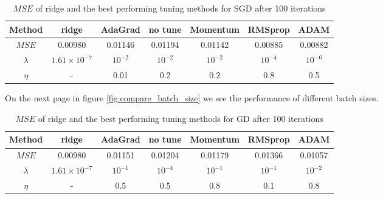 \documentclass[11pt]{article}
\begin{document}
\begin{table}[H]
    \centering
    \caption{$MSE$ of ridge and the best performing tuning methods for SGD after 100 iterations}
    \label{tab:ridge_compare_SGD}
    \begin{tabular}{|c|c|c|c|c|c|c|}
        \hline
        Method    & ridge               & AdaGrad   & no tune   & Momentum  & RMSprop   & ADAM      \\
        \hline
        $MSE$     & 0.00980             & 0.01146   & 0.01194   & 0.01142   & 0.00885   & 0.00882   \\
        \hline
        $\lambda$ & $1.61\times10^{-7}$ & $10^{-2}$ & $10^{-2}$ & $10^{-2}$ & $10^{-4}$ & $10^{-6}$ \\
        \hline
        $\eta$    & -                   & 0.01      & 0.2       & 0.2       & 0.8       & 0.5       \\
        \hline
    \end{tabular}
\end{table}
On the next page in figure \ref{fig:compare_batch_size} we see the performance of different batch sizes.
\begin{table}[H]
    \centering
    \caption{$MSE$ of ridge and the best performing tuning methods for GD after 100 iterations}
    \label{tab:ridge_compare_GD}
    \begin{tabular}{|c|c|c|c|c|c|c|}
        \hline
        Method    & ridge               & AdaGrad   & no tune   & Momentum  & RMSprop   & ADAM      \\
        \hline
        $MSE$     & 0.00980             & 0.01151   & 0.01204   & 0.01179   & 0.01366   & 0.01057   \\
        \hline
        $\lambda$ & $1.61\times10^{-7}$ & $10^{-1}$ & $10^{-4}$ & $10^{-1}$ & $10^{-1}$ & $10^{-2}$ \\
        \hline
        $\eta$    & -                   & 0.5       & 0.5       & 0.8       & 0.1       & 0.8       \\
        \hline
    \end{tabular}
\end{table}
\end{document}
